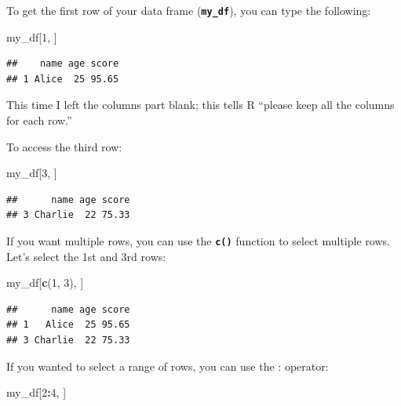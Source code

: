 \documentclass[
]{book}
\newenvironment{Shaded}{\begin{snugshade}}{\end{snugshade}}
\newcommand{\DecValTok}[1]{\textcolor[rgb]{0.00,0.00,0.81}{#1}}
\newcommand{\FunctionTok}[1]{\textcolor[rgb]{0.13,0.29,0.53}{\textbf{#1}}}
\newcommand{\NormalTok}[1]{#1}
\newcommand{\SpecialCharTok}[1]{\textcolor[rgb]{0.81,0.36,0.00}{\textbf{#1}}}
\begin{document}
To get the first row of your data frame (\textbf{\texttt{my\_df}}), you can type the following:

\begin{Shaded}
\begin{Highlighting}[]
\NormalTok{my\_df[}\DecValTok{1}\NormalTok{, ]}
\end{Highlighting}
\end{Shaded}

\begin{verbatim}
##    name age score
## 1 Alice  25 95.65
\end{verbatim}

This time I left the columns part blank; this tells R ``please keep all the columns for each row.''

To access the third row:

\begin{Shaded}
\begin{Highlighting}[]
\NormalTok{my\_df[}\DecValTok{3}\NormalTok{, ]}
\end{Highlighting}
\end{Shaded}

\begin{verbatim}
##      name age score
## 3 Charlie  22 75.33
\end{verbatim}

If you want multiple rows, you can use the \textbf{\texttt{c()}} function to select multiple rows. Let's select the 1st and 3rd rows:

\begin{Shaded}
\begin{Highlighting}[]
\NormalTok{my\_df[}\FunctionTok{c}\NormalTok{(}\DecValTok{1}\NormalTok{, }\DecValTok{3}\NormalTok{), ]}
\end{Highlighting}
\end{Shaded}

\begin{verbatim}
##      name age score
## 1   Alice  25 95.65
## 3 Charlie  22 75.33
\end{verbatim}

If you wanted to select a range of rows, you can use the : operator:

\begin{Shaded}
\begin{Highlighting}[]
\NormalTok{my\_df[}\DecValTok{2}\SpecialCharTok{:}\DecValTok{4}\NormalTok{, ]}
\end{Highlighting}
\end{Shaded}
\end{document}
